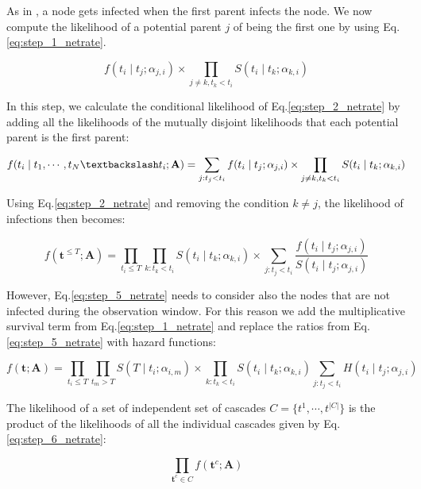 \documentclass[10pt]{article}
\begin{document}
As in \cite{kempe2003maximizing}, a node gets infected when the first parent infects the node. We now compute the likelihood of a potential parent $j$ of being the first one by using Eq.\ref{eq:step_1_netrate}.

\begin{equation}\label{eq:step_3_netrate}
f(t_{i}\mid t_{j};\alpha_{j,i})\times \prod_{j\neq k,t_{k}< t_{i}}S(t_{i}\mid t_{k};\alpha _{k,i})
\end{equation}
 
In this step, we calculate the conditional likelihood of Eq.\ref{eq:step_2_netrate} by adding all the likelihoods of the mutually disjoint likelihoods that each potential parent is the first parent:

\begin{equation}\label{eq:step_4_netrate}
f(t_{i}\mid t_{1},\cdots,t_{N}\textbackslash t_{i};\textbf{A})=\sum_{j:t_{j}<t_{i}}f(t_{i}\mid t_{j};\alpha _{j,i})\times \prod _{j\neq k,t_{k}<t_{i}}S(t_{i}\mid t_{k};\alpha _{k,i})
\end{equation}

Using Eq.\ref{eq:step_2_netrate} and removing the condition $k\neq j$, the likelihood of infections then becomes:

\begin{equation}\label{eq:step_5_netrate}
f(\textbf{t}^{\leq T};\textbf{A})=\prod_{t_{i}\leq T}\prod_{k:t_{k}<t_{i}}S(t_{i}\mid t_{k};\alpha _{k,i})\times \sum_{j:t_{j}<t_{i}}\frac{f(t_{i}\mid t_{j};\alpha_{j,i})}{S(t_{i}\mid t_{j};\alpha _{j,i})}
\end{equation}

However, Eq.\ref{eq:step_5_netrate} needs to consider also the nodes that are not infected during the observation window. For this reason we add the multiplicative survival term from Eq.\ref{eq:step_1_netrate} and replace the ratios from Eq.\ref{eq:step_5_netrate} with hazard functions:

\begin{equation}\label{eq:step_6_netrate}
f(\textbf{t};\textbf{A})=\prod_{t_{i}\leq T}\prod_{t_{m}>T}S(T\mid t_{i};\alpha_{i,m})\times \prod_{k:t_{k}<t_{i}}S(t_{i}\mid t_{k};\alpha _{k,i})\sum_{j:t_{j}<t_{i}}H(t_{i}\mid t_{j};\alpha _{j,i})
\end{equation}

The likelihood of a set of independent set of cascades $C=\{t^{1},\cdots,t^{|C|}\}$ is the product of the likelihoods of all the individual cascades given by Eq.\ref{eq:step_6_netrate}:

\begin{equation}\label{eq:step_7_netrate}
\prod _{\textbf{t}^{c}\in C}f(\textbf{t}^{c};\textbf{A})
\end{equation}

\printbibliography 
\end{document}
